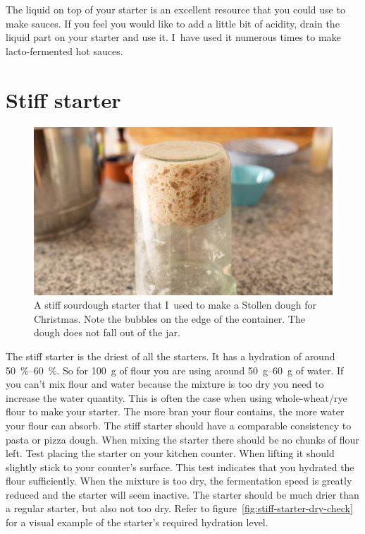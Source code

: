 The liquid on top of your starter is an excellent resource that you could use
to make sauces. If you feel you would like to add a little bit of acidity,
drain the liquid part on your starter and use it. I~have used it numerous
times to make lacto-fermented hot sauces.

\section{Stiff starter}%
\label{section:stiff-starter}

\begin{figure}[!htb]
  \includegraphics[width=\textwidth]{sourdough-starter-stiff.jpg}
  \caption[Stiff starter upside-down]{A stiff sourdough starter that I~used to
      make a Stollen dough for Christmas. Note the bubbles on the edge of the
      container. The dough does not fall out of the jar.}%
  \label{flc:stiff-sourdough-starter}
\end{figure}

The stiff starter is the driest of all the starters. It has a hydration of
around \qtyrange{50}{60}{\percent}. So for \qty{100}{\gram} of flour you are using around
\qtyrange{50}{60}{\gram} of water. If you can't mix flour and water because the
mixture is too dry you need to increase the water quantity. This is often
the case when using whole-wheat/rye flour to make your starter. The
more bran your flour contains, the more water your flour can absorb. The stiff
starter should have a comparable consistency to pasta or pizza dough. When
mixing the starter there should be no chunks of flour left. Test placing
the starter on your kitchen counter. When lifting it should slightly stick
to your counter's surface. This test indicates that you hydrated the flour sufficiently.
When the mixture is too dry, the fermentation speed is greatly reduced and
the starter will seem inactive. The starter should be much drier
than a regular starter, but also not too dry. Refer to figure~\ref{fig:stiff-starter-dry-check}
for a visual example of the starter's required hydration level.

